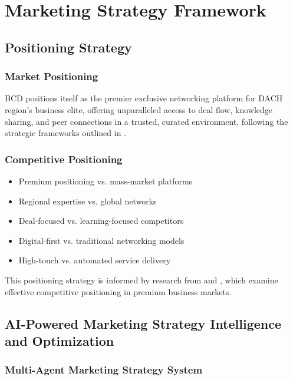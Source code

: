 \chapter{Marketing Strategy Framework}

\section{Positioning Strategy}

\subsection{Market Positioning}
BCD positions itself as the premier exclusive networking platform for DACH region's business elite, offering unparalleled access to deal flow, knowledge sharing, and peer connections in a trusted, curated environment, following the strategic frameworks outlined in \citep{abratt_competitive_analysis_and}.

\subsection{Competitive Positioning}
\begin{itemize}
    \item Premium positioning vs. mass-market platforms
    \item Regional expertise vs. global networks
    \item Deal-focused vs. learning-focused competitors
    \item Digital-first vs. traditional networking models
    \item High-touch vs. automated service delivery
\end{itemize}

This positioning strategy is informed by research from \citep{burgers_new_thoughts_on} and \citep{unknown_competitive_positioning}, which examine effective competitive positioning in premium business markets.

\section{AI-Powered Marketing Strategy Intelligence and Optimization}

\subsection{Multi-Agent Marketing Strategy System}


